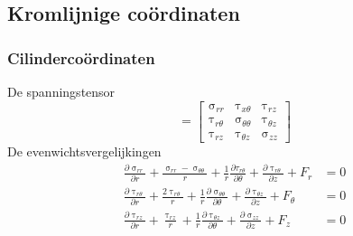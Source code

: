         \subsection{Kromlijnige coördinaten}
            
            \subsubsection{Cilindercoördinaten}

                De spanningstensor
                \begin{equation}
                    [\upsigma] = \left[\begin{matrix}
                        \upsigma_{rr} & \uptau_{x\theta} & \uptau_{rz} \\
                        \uptau_{r\theta} & \upsigma_{\theta \theta} & \uptau_{\theta z} \\
                        \uptau_{rz} & \uptau_{\theta z} & \upsigma_{zz}
                        \label{spanningstensor_cilinder}
                    \end{matrix}\right]
                \end{equation}
                De evenwichtsvergelijkingen
                \begin{align}
                    \frac{\partial \upsigma_{rr}}{\partial r} + \frac{\upsigma_{rr}-\upsigma_{\theta\theta}}{r} + \frac{1}{r}\frac{\partial \tau_{r\theta}}{\partial \theta} + \frac{\partial \uptau_{r\theta}}{\partial z} + F_r & = 0\nonumber\\
                    \frac{\partial \uptau_{r\theta}}{\partial r} + \frac{2\uptau_{r\theta}}{r} + \frac{1}{r}\frac{\partial \upsigma_{\theta\theta}}{\partial \theta}+\frac{\partial \uptau_{\theta z}}{\partial z}+F_{\theta} & = 0\nonumber\\
                    \frac{\partial \uptau_{rz}}{\partial r} + \frac{\uptau_{rz}}{r} + \frac{1}{r}\frac{\partial \uptau_{\theta z}}{\partial \theta}+\frac{\partial \upsigma_{zz}}{\partial z}+F_z & = 0\nonumber\\
                    \label{vergelijkingen_van_het_evenwicht_cilinder}
                \end{align}

